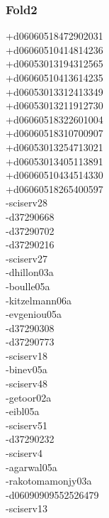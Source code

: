 \begin{multicols}{3}
\subsubsection*{Fold2}
+d06060518472902031\\
+d06060510414814236\\
+d06053013194312565\\
+d06060510413614235\\
+d06053013312413349\\
+d06053013211912730\\
+d06060518322601004\\
+d06060518310700907\\
+d06053013254713021\\
+d06053013405113891\\
+d06060510434514330\\
+d06060518265400597\\
-sciserv28\\
-d37290668\\
-d37290702\\
-d37290216\\
-sciserv27\\
-dhillon03a\\
-boulle05a\\
-kitzelmann06a\\
-evgeniou05a\\
-d37290308\\
-d37290773\\
-sciserv18\\
-binev05a\\
-sciserv48\\
-getoor02a\\
-eibl05a\\
-sciserv51\\
-d37290232\\
-sciserv4\\
-agarwal05a\\
-rakotomamonjy03a\\
-d06090909552526479\\
-sciserv13\\

\end{multicols}
